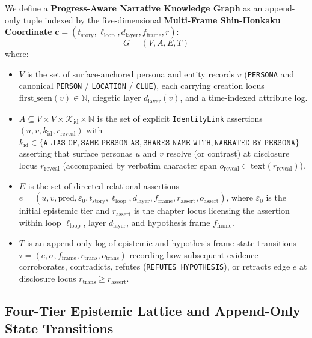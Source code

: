 \documentclass[11pt,twocolumn]{article}
\begin{document}
We define a \textbf{Progress-Aware Narrative Knowledge Graph} as an append-only tuple indexed by the five-dimensional \textbf{Multi-Frame Shin-Honkaku Coordinate} $\mathbf{c} = (t_{\text{story}}, \ell_{\text{loop}}, d_{\text{layer}}, f_{\text{frame}}, r)$:
\begin{equation}
G = (V, A, E, T)
\label{eq:graph_tuple}
\end{equation}
where:
\begin{itemize}
  \item $V$ is the set of surface-anchored persona and entity records $v$ (\texttt{PERSONA} and canonical \texttt{PERSON} / \texttt{LOCATION} / \texttt{CLUE}), each carrying creation locus $\text{first\_seen}(v) \in \mathbb{N}$, diegetic layer $d_{\text{layer}}(v)$, and a time-indexed attribute log.
  \item $A \subseteq V \times V \times \mathcal{K}_{\text{id}} \times \mathbb{N}$ is the set of explicit \texttt{IdentityLink} assertions $(u, v, k_{\text{id}}, r_{\text{reveal}})$ with $k_{\text{id}} \in \{\texttt{ALIAS\_OF}, \texttt{SAME\_PERSON\_AS}, \texttt{SHARES\_NAME\_WITH}, \texttt{NARRATED\_BY\_PERSONA}\}$ asserting that surface personas $u$ and $v$ resolve (or contrast) at disclosure locus $r_{\text{reveal}}$ (accompanied by verbatim character span $o_{\text{reveal}} \subset \text{text}(r_{\text{reveal}})$).
  \item $E$ is the set of directed relational assertions $e = (u, v, \text{pred}, \varepsilon_0, t_{\text{story}}, \ell_{\text{loop}}, d_{\text{layer}}, f_{\text{frame}}, r_{\text{assert}}, o_{\text{assert}})$, where $\varepsilon_0$ is the initial epistemic tier and $r_{\text{assert}}$ is the chapter locus licensing the assertion within loop $\ell_{\text{loop}}$, layer $d_{\text{layer}}$, and hypothesis frame $f_{\text{frame}}$.
  \item $T$ is an append-only log of epistemic and hypothesis-frame state transitions $\tau = (e, \sigma, f_{\text{frame}}, r_{\text{trans}}, o_{\text{trans}})$ recording how subsequent evidence corroborates, contradicts, refutes (\texttt{REFUTES\_HYPOTHESIS}), or retracts edge $e$ at disclosure locus $r_{\text{trans}} \ge r_{\text{assert}}$.
\end{itemize}

\subsection{Four-Tier Epistemic Lattice and Append-Only State Transitions}
\label{sec:epistemic_lattice}
\end{document}
